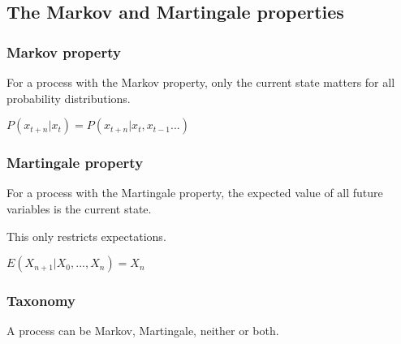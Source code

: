 
\subsection{The Markov and Martingale properties}

\subsubsection{Markov property}

For a process with the Markov property, only the current state matters for all probability distributions.

\(P(x_{t+n}|x_t)=P(x_{t+n}|x_t, x_{t-1}...)\)

\subsubsection{Martingale property}

For a process with the Martingale property, the expected value of all future variables is the current state.

This only restricts expectations.

\(E(X_{n+1}|X_0,...,X_n)=X_n\)

\subsubsection{Taxonomy}

A process can be Markov, Martingale, neither or both.


